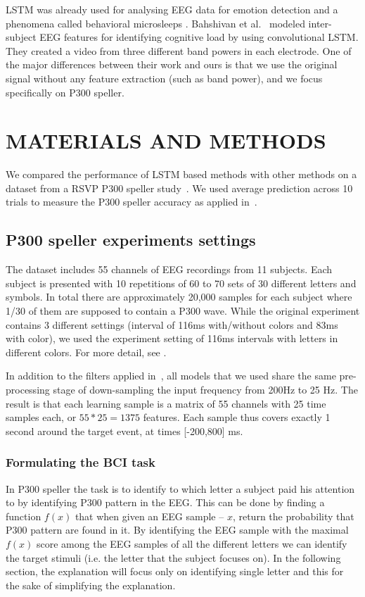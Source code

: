 \documentclass[
12pt, %
english, %
doublespacing, %
headsepline, %
]{MastersDoctoralThesis} %
\begin{document}
LSTM was already used for analysing EEG data for emotion detection \cite{soleymani2014continuous} and a phenomena called behavioral microsleeps \cite{davidson2005detecting}. Bahshivan et al.~\cite{LSTM_EEG} modeled inter-subject EEG features for identifying cognitive load by using convolutional LSTM. They created a video from three different band powers in each electrode. One of the major differences between their work and ours is that we use the original signal without any feature extraction (such as band power), and we focus specifically on P300 speller.



\chapter{MATERIALS AND METHODS}

We compared the performance of LSTM based methods with other methods on a dataset from a RSVP P300 speller study~\cite{BlaknertzExperiment}. We used  average prediction across 10 trials to measure the P300 speller accuracy as applied in~\cite{BlaknertzExperiment}.




\section{P300 speller experiments settings}
The dataset includes 55 channels of EEG recordings from 11 subjects. Each subject is presented with 10 repetitions of 60 to 70 sets of 30 different letters and symbols. In total there are approximately 20,000 samples for each subject where 1/30 of them are supposed to contain a P300 wave. While the original experiment contains 3 different settings (interval of 116ms with/without colors and 83ms with color), we used the experiment setting of 116ms intervals with letters in different colors. For more detail, see \cite{BlaknertzExperiment}. 

In addition to the filters applied in~\cite{BlaknertzExperiment}, all models that we used share the same pre-processing stage of down-sampling the input frequency from 200Hz to 25 Hz. The result is that each learning sample is a matrix of 55 channels with 25 time samples each, or $55*25 = 1375$ features. Each sample thus covers exactly 1 second around the target event, at times [-200,800] ms.


\subsection{Formulating the BCI task}
In P300 speller the task is to identify to which letter a subject paid his attention to by identifying P300 pattern in the EEG. This can be done by finding a function $f(x)$ that when given an EEG sample – $x$, return the probability that P300 pattern are found in it. By identifying the EEG sample with the maximal $f(x)$ score among the EEG samples of all the different letters we can identify the target stimuli (i.e. the letter that the subject focuses on). In the following section, the explanation will focus only on identifying single letter and this for the sake of simplifying the explanation.
\end{document}
